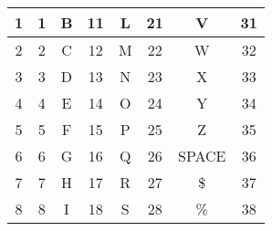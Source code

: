 \begin{appendix}
\begin{table}[htbp]
\begin{tabular}{cccccccc}
			\multicolumn{1}{|c|}{1}                & \multicolumn{1}{c|}{1}             & \multicolumn{1}{c|}{B}                & \multicolumn{1}{c|}{11}            & \multicolumn{1}{c|}{L}                & \multicolumn{1}{c|}{21}            & \multicolumn{1}{c|}{V}                & \multicolumn{1}{c|}{31}            \\ \hline
			\multicolumn{1}{|c|}{2}                & \multicolumn{1}{c|}{2}             & \multicolumn{1}{c|}{C}                & \multicolumn{1}{c|}{12}            & \multicolumn{1}{c|}{M}                & \multicolumn{1}{c|}{22}            & \multicolumn{1}{c|}{W}                & \multicolumn{1}{c|}{32}            \\ \hline
			\multicolumn{1}{|c|}{3}                & \multicolumn{1}{c|}{3}             & \multicolumn{1}{c|}{D}                & \multicolumn{1}{c|}{13}            & \multicolumn{1}{c|}{N}                & \multicolumn{1}{c|}{23}            & \multicolumn{1}{c|}{X}                & \multicolumn{1}{c|}{33}            \\ \hline
			\multicolumn{1}{|c|}{4}                & \multicolumn{1}{c|}{4}             & \multicolumn{1}{c|}{E}                & \multicolumn{1}{c|}{14}            & \multicolumn{1}{c|}{O}                & \multicolumn{1}{c|}{24}            & \multicolumn{1}{c|}{Y}                & \multicolumn{1}{c|}{34}            \\ \hline
			\multicolumn{1}{|c|}{5}                & \multicolumn{1}{c|}{5}             & \multicolumn{1}{c|}{F}                & \multicolumn{1}{c|}{15}            & \multicolumn{1}{c|}{P}                & \multicolumn{1}{c|}{25}            & \multicolumn{1}{c|}{Z}                & \multicolumn{1}{c|}{35}            \\ \hline
			\multicolumn{1}{|c|}{6}                & \multicolumn{1}{c|}{6}             & \multicolumn{1}{c|}{G}                & \multicolumn{1}{c|}{16}            & \multicolumn{1}{c|}{Q}                & \multicolumn{1}{c|}{26}            & \multicolumn{1}{c|}{SPACE}            & \multicolumn{1}{c|}{36}            \\ \hline
			\multicolumn{1}{|c|}{7}                & \multicolumn{1}{c|}{7}             & \multicolumn{1}{c|}{H}                & \multicolumn{1}{c|}{17}            & \multicolumn{1}{c|}{R}                & \multicolumn{1}{c|}{27}            & \multicolumn{1}{c|}{\$}                & \multicolumn{1}{c|}{37}            \\ \hline
			\multicolumn{1}{|c|}{8}                & \multicolumn{1}{c|}{8}             & \multicolumn{1}{c|}{I}                & \multicolumn{1}{c|}{18}            & \multicolumn{1}{c|}{S}                & \multicolumn{1}{c|}{28}            & \multicolumn{1}{c|}{\%}               & \multicolumn{1}{c|}{38}            \\ \hline

\end{tabular}
\end{table}
\end{appendix}
